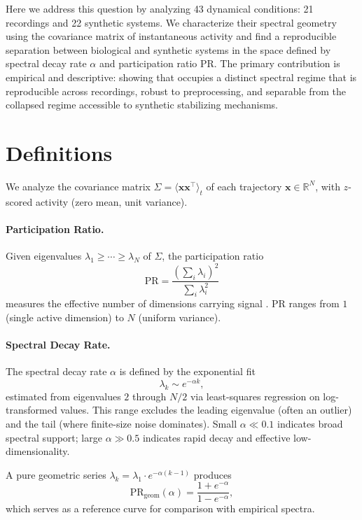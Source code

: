 \documentclass[aps,pre,reprint,twocolumn]{revtex4-2}
\newcommand{\mec}{\text{MEC}}
\begin{document}
Here we address this question by analyzing 43 dynamical conditions: 21 \mec{} recordings and 22 synthetic systems. We characterize their spectral geometry using the covariance matrix of instantaneous activity and find a reproducible separation between biological and synthetic systems in the space defined by spectral decay rate $\alpha$ and participation ratio PR. The primary contribution is empirical and descriptive: showing that \mec{} occupies a distinct spectral regime that is reproducible across recordings, robust to preprocessing, and separable from the collapsed regime accessible to synthetic stabilizing mechanisms.

\section{Definitions}
\label{sec:defs}

We analyze the covariance matrix $\Sigma = \langle \mathbf{x}\mathbf{x}^\top \rangle_t$ of each trajectory $\mathbf{x} \in \mathbb{R}^N$, with $z$-scored activity (zero mean, unit variance).

\paragraph{Participation Ratio.}
Given eigenvalues $\lambda_1 \ge \cdots \ge \lambda_N$ of $\Sigma$, the participation ratio
\begin{equation}
\text{PR} = \frac{(\sum_i \lambda_i)^2}{\sum_i \lambda_i^2}
\end{equation}
measures the effective number of dimensions carrying signal \cite{wegner1980}. PR ranges from $1$ (single active dimension) to $N$ (uniform variance).

\paragraph{Spectral Decay Rate.}
The spectral decay rate $\alpha$ is defined by the exponential fit
\begin{equation}
\lambda_k \sim e^{-\alpha k},
\end{equation}
estimated from eigenvalues $2$ through $N/2$ via least-squares regression on log-transformed values. This range excludes the leading eigenvalue (often an outlier) and the tail (where finite-size noise dominates). Small $\alpha \ll 0.1$ indicates broad spectral support; large $\alpha \gg 0.5$ indicates rapid decay and effective low-dimensionality.

A pure geometric series $\lambda_k = \lambda_1 \cdot e^{-\alpha(k-1)}$ produces
\begin{equation}
\text{PR}_{\text{geom}}(\alpha) = \frac{1 + e^{-\alpha}}{1 - e^{-\alpha}},
\label{eq:reference}
\end{equation}
which serves as a reference curve for comparison with empirical spectra.
\end{document}

